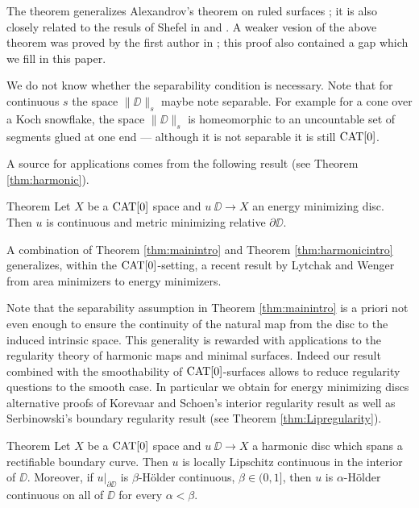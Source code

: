 \documentclass{article}
\begin{document}
The theorem generalizes Alexandrov's theorem on ruled surfaces \cite{A};
it is also closely related to the resuls of Shefel in \cite{shefel-2D} and \cite{shefel-3D}.
A weaker vesion of the above theorem was proved by the first author in \cite{petrunin-metric-min};
this proof also contained a gap which we fill in this paper. 

We do not know whether the separability condition is necessary.
Note that for continuous $s$ the space $\|\DD\|_s$ maybe note separable.
For example for a cone over a Koch snowflake, the space $\|\DD\|_s$ is homeomorphic to an uncountable set of segments glued at one end --- although it is not separable it is still $\mathop{\rm CAT}\nolimits[0]$.

A source for applications comes from the following result (see Theorem \ref{thm:harmonic}).

\begin{thm}{Theorem}\label{thm:harmonicintro}
Let $X$ be a $\mathop{\rm CAT}\nolimits[0]$ space 
and $u\:\DD\to X$ an energy minimizing disc.
Then $u$ is continuous and metric minimizing relative $\partial\DD$.
\end{thm}

A combination of Theorem \ref{thm:mainintro} and Theorem \ref{thm:harmonicintro} generalizes, within the $\mathop{\rm CAT}\nolimits[0]$-setting,
a recent result by Lytchak and Wenger %
from area minimizers to energy minimizers.


Note that the separability assumption in Theorem \ref{thm:mainintro} is a priori not even enough to ensure the continuity of the natural 
map from the disc to the induced intrinsic space. This generality is rewarded with applications to the regularity theory of harmonic maps 
and minimal surfaces. 
Indeed our result combined with the smoothability of $\mathop{\rm CAT}\nolimits[0]$-surfaces %
allows to reduce regularity questions to the smooth case. 
In particular we obtain for energy minimizing discs alternative proofs of Korevaar and Schoen's interior regularity
result \cite{KS} as well as Serbinowski's boundary regularity result \cite{Se} (see Theorem \ref{thm:Lipregularity}). 

\begin{thm}{Theorem}\label{thm:Lipregularityintro}
Let $X$ be a $\mathop{\rm CAT}\nolimits[0]$ space 
and $u\:\DD\to X$ a harmonic disc which spans a rectifiable boundary curve. 
Then $u$ is locally Lipschitz continuous in the interior of $\DD$. 
Moreover, if $u|_{\partial\DD}$ is $\beta$-H\"older continuous, $\beta\in(0,1]$, then $u$ is $\alpha$-H\"older continuous on all of
$\DD$ for every $\alpha<\beta$.
\end{thm}
\end{document}
